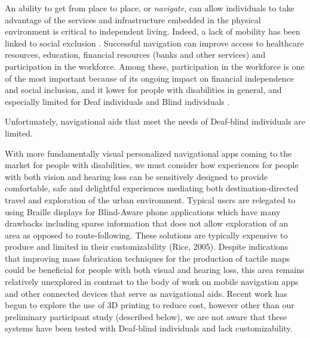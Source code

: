 

An ability to get from place to place, or \textit{navigate}, can allow individuals to take advantage of the  services and infrastructure embedded in the physical environment is critical to independent living. Indeed, a lack of mobility has been linked to social exclusion \cite{kenyon2002transport}.  Successful navigation can improve access to healthcare resources, education, financial resources (banks and other services) and participation in the workforce. Among these, participation in the workforce is one of the most important because of its ongoing impact on financial independence and social inclusion, and it lower for people with disabilities in general, and especially limited for Deaf individuals and Blind individuals \cite{zwerling2002workforce}.

Unfortunately,  navigational aids that meet the needs of  Deaf-blind individuals are limited.

With more fundamentally visual personalized navigational apps coming to the market for people with disabilities, we must consider how experiences for people with both vision and hearing loss can be sensitively designed to provide comfortable, safe and delightful experiences mediating both destination-directed travel and exploration of the urban environment. 
Typical users are relegated to using Braille displays for Blind-Aware phone applications which have many drawbacks including sparse information that does not allow exploration of an area as opposed to route-following.
These solutions are typically expensive to produce and limited in their customizability (Rice, 2005). Despite indications that improving mass fabrication techniques for the production of tactile maps could be beneficial for people with both visual and hearing loss, this area remains relatively unexplored in contrast to the body of work on mobile navigation apps and other connected devices that serve as navigational aids.
Recent work has begun to explore the use of 3D printing to reduce cost, however other than our preliminary participant study (described below), we are not aware that these systems have been tested with Deaf-blind individuals and lack customizability. 

